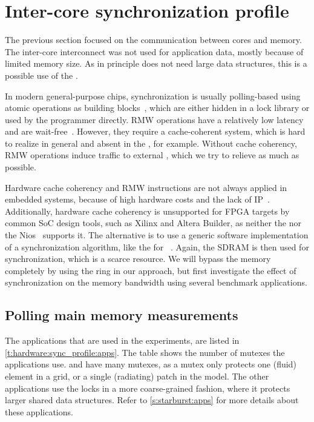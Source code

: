 \section{Inter-core synchronization profile}
\label{s:hardware:syncprofile}


The previous section focused on the communication between cores and memory.
The inter-core interconnect was not used for application data, mostly because of limited memory size.
As  in principle does not need large data structures, this is a possible use of the .

In modern general-purpose chips, synchronization is usually polling-based using atomic  operations as building blocks~\cite{mellor-crummey:scalable_sync,culler:comp_arch}, which are either hidden in a lock library or used by the programmer directly.
\ac{RMW} operations have a relatively low latency and are wait-free~\cite{herlihy:wait_free}.
However, they require a cache-coherent system, which is hard to realize in general and absent in the \IntelSCC, for example.
Without cache coherency, \ac{RMW} operations induce traffic to external , which we try to relieve as much as possible.

Hardware cache coherency and \ac{RMW} instructions are not always applied in embedded systems, because of high hardware costs and the lack of \ac{IP}~\cite{ophelders:software_cache}.
Additionally, hardware cache coherency is unsupported for \ac{FPGA} targets by common \ac{SoC} design tools, such as Xilinx  and Altera  Builder, as neither the \MicroBlaze nor the Nios~ supports it.
The alternative is to use a generic software implementation of a synchronization algorithm, like the  for ~\cite{lamport:mutex}.
Again, the \ac{SDRAM} is then used for synchronization, which is a scarce resource.
We will bypass the memory completely by using the ring in our approach, but first investigate the effect of synchronization on the memory bandwidth using several benchmark applications.

\subsection{Polling main memory measurements}

The applications that are used in the experiments, are listed in \vref{t:hardware:sync_profile:apps}.
The table shows the number of mutexes the applications use.
 and  have many mutexes, as a mutex only protects one (fluid) element in a grid, or a single (radiating) patch in the  model.
The other applications use the locks in a more coarse-grained fashion, where it protects larger shared data structures.
Refer to \cref{s:starburst:apps} for more details about these applications.

